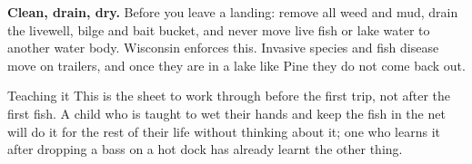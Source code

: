\begin{telosframe}
\textbf{Clean, drain, dry.} Before you leave a landing: remove all weed and mud,
drain the livewell, bilge and bait bucket, and never move live fish or lake
water to another water body. Wisconsin enforces this. Invasive species and fish
disease move on trailers, and once they are in a lake like Pine they do not come
back out.
\end{telosframe}

\begin{telospanel}{Teaching it}
This is the sheet to work through before the first trip, not after the first
fish. A child who is taught to wet their hands and keep the fish in the net will
do it for the rest of their life without thinking about it; one who learns it
after dropping a bass on a hot dock has already learnt the other thing.
\end{telospanel}


